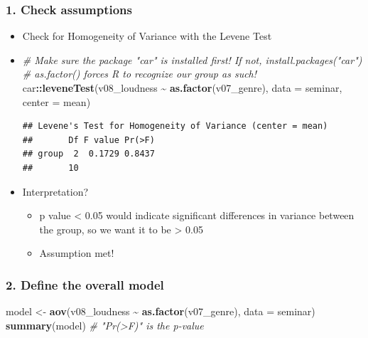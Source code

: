 \documentclass[
]{book}
\newenvironment{Shaded}{\begin{snugshade}}{\end{snugshade}}
\newcommand{\AttributeTok}[1]{\textcolor[rgb]{0.13,0.29,0.53}{#1}}
\newcommand{\CommentTok}[1]{\textcolor[rgb]{0.56,0.35,0.01}{\textit{#1}}}
\newcommand{\FunctionTok}[1]{\textcolor[rgb]{0.13,0.29,0.53}{\textbf{#1}}}
\newcommand{\NormalTok}[1]{#1}
\newcommand{\OtherTok}[1]{\textcolor[rgb]{0.56,0.35,0.01}{#1}}
\newcommand{\SpecialCharTok}[1]{\textcolor[rgb]{0.81,0.36,0.00}{\textbf{#1}}}
\providecommand{\tightlist}{%
  \setlength{\itemsep}{0pt}\setlength{\parskip}{0pt}}
\begin{document}
\subsubsection{1. Check assumptions}\label{check-assumptions}

\begin{itemize}
\item
  Check for Homogeneity of Variance with the Levene Test
\item
\begin{Shaded}
\begin{Highlighting}[]
\CommentTok{\# Make sure the package "car" is installed first! If not, install.packages("car")}
\CommentTok{\# as.factor() forces R to recognize our group as such!}
\NormalTok{car}\SpecialCharTok{::}\FunctionTok{leveneTest}\NormalTok{(v08\_loudness }\SpecialCharTok{\textasciitilde{}} \FunctionTok{as.factor}\NormalTok{(v07\_genre), }\AttributeTok{data =}\NormalTok{ seminar, }\AttributeTok{center =}\NormalTok{ mean)}
\end{Highlighting}
\end{Shaded}

\begin{verbatim}
## Levene's Test for Homogeneity of Variance (center = mean)
##       Df F value Pr(>F)
## group  2  0.1729 0.8437
##       10
\end{verbatim}
\item
  Interpretation?

  \begin{itemize}
  \tightlist
  \item
    p value \textless{} 0.05 would indicate significant differences in variance between the group, so we want it to be \textgreater{} 0.05
  \item
    Assumption met!
  \end{itemize}
\end{itemize}

\subsubsection{2. Define the overall model}\label{define-the-overall-model}

\begin{Shaded}
\begin{Highlighting}[]
\NormalTok{model }\OtherTok{\textless{}{-}} \FunctionTok{aov}\NormalTok{(v08\_loudness }\SpecialCharTok{\textasciitilde{}} \FunctionTok{as.factor}\NormalTok{(v07\_genre), }\AttributeTok{data =}\NormalTok{ seminar)}
\FunctionTok{summary}\NormalTok{(model) }\CommentTok{\# "Pr(\textgreater{}F)" is the p{-}value}
\end{Highlighting}
\end{Shaded}
\end{document}
